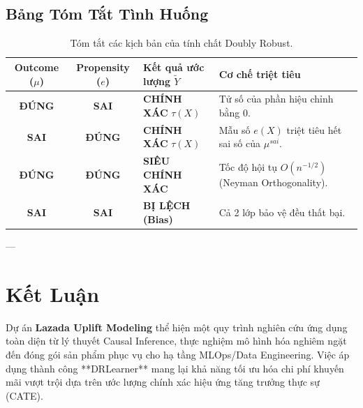 \documentclass[11pt,a4paper]{article}
\begin{document}
\subsection{Bảng Tóm Tắt Tình Huống}

\begin{table}[H]
\centering
\small
\begin{tabularx}{\textwidth}{ccXl}
\toprule
\textbf{Outcome ($\mu$)} & \textbf{Propensity ($e$)} & \textbf{Kết quả ước lượng $\tilde{Y}$} & \textbf{Cơ chế triệt tiêu} \\
\midrule
\textbf{ĐÚNG} & \textbf{SAI} & \textbf{CHÍNH XÁC} $\tau(X)$ & Tử số của phần hiệu chỉnh bằng 0. \\
\textbf{SAI} & \textbf{ĐÚNG} & \textbf{CHÍNH XÁC} $\tau(X)$ & Mẫu số $e(X)$ triệt tiêu hết sai số của $\mu^{sai}$. \\
\textbf{ĐÚNG} & \textbf{ĐÚNG} & \textbf{SIÊU CHÍNH XÁC} & Tốc độ hội tụ $O(n^{-1/2})$ (Neyman Orthogonality). \\
\textbf{SAI} & \textbf{SAI} & \textbf{BỊ LỆCH (Bias)} & Cả 2 lớp bảo vệ đều thất bại. \\
\bottomrule
\end{tabularx}
\caption{Tóm tắt các kịch bản của tính chất Doubly Robust.}
\end{table}

---

\section{Kết Luận}
Dự án \textbf{Lazada Uplift Modeling} thể hiện một quy trình nghiên cứu ứng dụng toàn diện từ lý thuyết Causal Inference, thực nghiệm mô hình hóa nghiêm ngặt đến đóng gói sản phẩm phục vụ cho hạ tầng MLOps/Data Engineering. Việc áp dụng thành công **DRLearner** mang lại khả năng tối ưu hóa chi phí khuyến mãi vượt trội dựa trên ước lượng chính xác hiệu ứng tăng trưởng thực sự (CATE).
\end{document}

